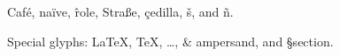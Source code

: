 Caf\'e, na\"ive, \^role, Stra\ss e, \c{c}edilla, \v{s}, and \~{n}.

Special glyphs: \LaTeX, \TeX, \ldots, \& ampersand, and \S section.
